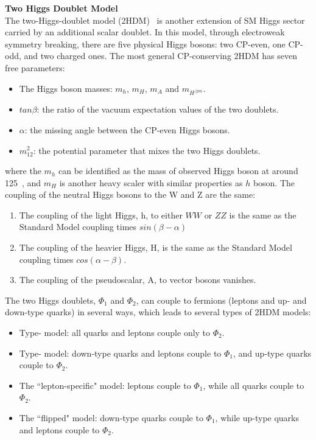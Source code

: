 \textbf{Two Higgs Doublet Model} \\
The two-Higgs-doublet model (2HDM)~\cite{BRANCO20121} is another extension of SM Higgs sector carried by an additional scalar doublet.
In this model, through electroweak symmetry breaking, there are five physical Higgs bosons: two CP-even, one CP-odd, and two charged ones.
The most general CP-conserving 2HDM has seven free parameters:
\begin{itemize}
    \item The Higgs boson masses: $m_{h}$, $m_{H}$, $m_{A}$ and $m_{H^{/pm}}$.
    \item $tan \beta$: the ratio of the vacuum expectation values of the two doublets.
    \item $\alpha$: the missing angle between the CP-even Higgs bosons.
    \item $m_{12}^{2}$: the potential parameter that mixes the two Higgs doublets.
\end{itemize}
where the $m_{h}$ can be identified as the mass of observed Higgs boson at around 125~\gev, and $m_{H}$ is another heavy scaler with similar properties as $h$ boson.
The coupling of the neutral Higgs bosons to the W and Z are the same: 
\begin{enumerate}
    \item The coupling of the light Higgs, h, to either $WW$ or $ZZ$ is the same as the Standard Model coupling times $sin(\beta - \alpha)$ 
    \item The coupling of the heavier Higgs, H, is the same as the Standard Model coupling times $cos(\alpha - \beta)$.
    \item The coupling of the pseudoscalar, A, to vector bosons vanishes.
\end{enumerate}
The two Higgs doublets, $\Phi_{1}$ and $\Phi_{2}$, can couple to fermions (leptons and up- and down-type quarks) in several ways, which leads to several types of 2HDM models:
\begin{itemize}
    \item Type-\uppercase\expandafter{} model: all quarks and leptons couple only to $\Phi_{2}$.
    \item Type-\uppercase\expandafter{} model: down-type quarks and leptons couple to $\Phi_{1}$, and up-type quarks couple to $\Phi_{2}$.
    \item The ``lepton-specific" model: leptons couple to $\Phi_{1}$, while all quarks couple to $\Phi_{2}$.
    \item The ``flipped" model: down-type quarks couple to $\Phi_{1}$, while up-type quarks and leptons couple to $\Phi_{2}$.
\end{itemize}

